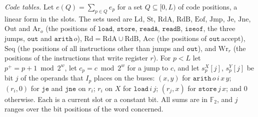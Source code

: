 \emph{Code tables.} Let \(e(Q)=\sum_{p\in Q}e_p\) for a set
\(Q\subseteq[0,L)\) of code positions, a linear form in the slots. The
sets used are \(\mathrm{Ld}\), \(\mathrm{St}\), \(\mathrm{RdA}\),
\(\mathrm{RdB}\), \(\mathrm{Eof}\), \(\mathrm{Jmp}\), \(\mathrm{Je}\),
\(\mathrm{Jne}\), \(\mathrm{Out}\) and \(\mathrm{Ar}_o\) (the positions of
\(\mathtt{load}\), \(\mathtt{store}\), \(\mathtt{readA}\),
\(\mathtt{readB}\), \(\mathtt{iseof}\), the three jumps, \(\mathtt{out}\)
and \(\mathtt{arith}\,o\)), \(\mathrm{Rd}=\mathrm{RdA}\cup\mathrm{RdB}\),
\(\mathrm{Acc}\) (the positions of \(\mathtt{out}\,\mathrm{accept}\)),
\(\mathrm{Seq}\) (the positions of all instructions other than jumps and
\(\mathtt{out}\)), and \(\mathrm{Wr}_r\) (the positions of the
instructions that write register \(r\)). For \(p<L\) let
\(p^+=p+1\bmod2^w\), let \(c_p=c\bmod2^w\) for a jump to \(c\), and let
\(s^X_p[j]\), \(s^Y_p[j]\) be bit \(j\) of the operands that \(I_p\)
places on the buses: \((x,y)\) for \(\mathtt{arith}\,o\,i\,x\,y\);
\((r_i,0)\) for \(\mathtt{je}\) and \(\mathtt{jne}\) on \(r_i\); \(r_i\)
on \(X\) for \(\mathtt{load}\,i\,j\); \((r_j,x)\) for
\(\mathtt{store}\,j\,x\); and \(0\) otherwise. Each is a current slot or
a constant bit. All sums are in \(\mathbb F_2\), and \(j\) ranges over
the bit positions of the word concerned.

